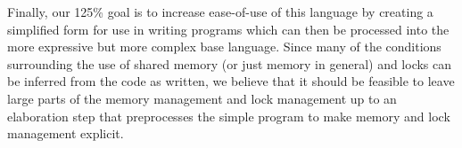 \documentclass{article}
\begin{document}
Finally, our 125\% goal is to increase ease-of-use of this language by creating a simplified form for use in writing programs which can then be processed into the more expressive but more complex base language.
Since many of the conditions surrounding the use of shared memory (or just memory in general) and locks can be inferred from the code as written, we believe that it should be feasible to leave large parts of the memory management and lock management up to an elaboration step that preprocesses the simple program to make memory and lock management explicit.




\end{document}
